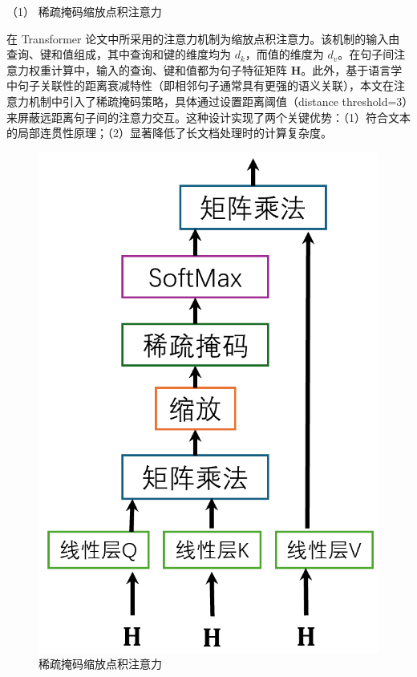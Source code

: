 （1） 稀疏掩码缩放点积注意力

在 Transformer 论文中所采用的注意力机制为缩放点积注意力。该机制的输入由查询、键和值组成，其中查询和键的维度均为 \(d_k\)，而值的维度为 \(d_v\)。在句子间注意力权重计算中，输入的查询、键和值都为句子特征矩阵 \(\textbf{H}\)。此外，基于语言学中句子关联性的距离衰减特性（即相邻句子通常具有更强的语义关联），本文在注意力机制中引入了稀疏掩码策略，具体通过设置距离阈值（distance threshold=3）来屏蔽远距离句子间的注意力交互。这种设计实现了两个关键优势：（1）符合文本的局部连贯性原理；（2）显著降低了长文档处理时的计算复杂度。

\begin{figure}[htbp]
	\centering
	\includegraphics[scale = 0.4]{figures/DotAtt}
	\caption{稀疏掩码缩放点积注意力}
	\label{fig:DotAtt}
\end{figure}

